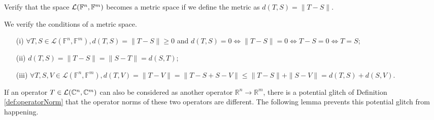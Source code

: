 \begin{exc}
  Verify that the space ${\cal L}(\mathbb{F}^n,\mathbb{F}^m)$
  becomes a metric space
  if we define the metric as $d(T,S)=\|T-S\|$.
\end{exc}
\begin{solution}
  We verify the conditions of a metric space.
  \begin{itemize}\itemsep0em
  \item[(i)] $\forall T, S \in \mathcal{L}(\mathbb{F}^n,
    \mathbb{F}^m),
    d(T, S) = \|T - S\| \geq 0 $
    and $d(T, S) = 0 \iff \|T - S\| = 0 \iff T - S = 0 \iff T = S$;
  \item[(ii)] $d(T, S) = \|T - S\| = \|S - T\| = d(S, T)$;
  \item[(iii)] $\forall T, S ,V \in \mathcal{L}(\mathbb{F}^n,
    \mathbb{F}^m),
    d(T, V) = \|T - V\| = \|T - S + S - V\| \leq \|T - S\| + \|S - V\|
    = d(T, S) + d(S, V)$.
  \end{itemize}
\end{solution}

\begin{rem}
  If an operator $T\in{\cal L}(\mathbb{C}^n,\mathbb{C}^m)$
  can also be considered as another operator
  $\mathbb{R}^n \rightarrow \mathbb{R}^m$, 
  there is a potential glitch of Definition \ref{def:operatorNorm}
  that the operator norms
  of these two operators are different.
  The following lemma prevents this potential glitch
  from happening.
\end{rem}

